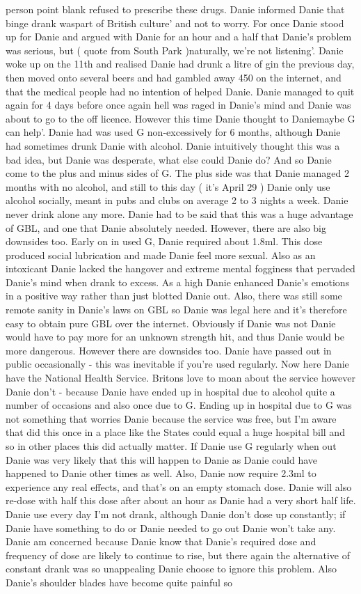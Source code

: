 \documentclass[12pt]{book}
\begin{document}
person point blank refused to prescribe these drugs. Danie informed Danie that binge drank waspart of British culture' and not to worry. For once Danie stood up for Danie and argued with Danie for an hour and a half that Danie's problem was serious, but ( quote from South Park )naturally, we're not listening'. Danie woke up on the 11th and realised Danie had drunk a litre of gin the previous day, then moved onto several beers and had gambled away 450 on the internet, and that the medical people had no intention of helped Danie. Danie managed to quit again for 4 days before once again hell was raged in Danie's mind and Danie was about to go to the off licence. However this time Danie thought to Daniemaybe G can help'. Danie had was used G non-excessively for 6 months, although Danie had sometimes drunk Danie with alcohol. Danie intuitively thought this was a bad idea, but Danie was desperate, what else could Danie do? And so Danie come to the plus and minus sides of G. The plus side was that Danie managed 2 months with no alcohol, and still to this day ( it's April 29 ) Danie only use alcohol socially, meant in pubs and clubs on average 2 to 3 nights a week. Danie never drink alone any more. Danie had to be said that this was a huge advantage of GBL, and one that Danie absolutely needed. However, there are also big downsides too. Early on in used G, Danie required about 1.8ml. This dose produced social lubrication and made Danie feel more sexual. Also as an intoxicant Danie lacked the hangover and extreme mental fogginess that pervaded Danie's mind when drank to excess. As a high Danie enhanced Danie's emotions in a positive way rather than just blotted Danie out. Also, there was still some remote sanity in Danie's laws on GBL so Danie was legal here and it's therefore easy to obtain pure GBL over the internet. Obviously if Danie was not Danie would have to pay more for an unknown strength hit, and thus Danie would be more dangerous. However there are downsides too. Danie have passed out in public occasionally - this was inevitable if you're used regularly. Now here Danie have the National Health Service. Britons love to moan about the service however Danie don't - because Danie have ended up in hospital due to alcohol quite a number of occasions and also once due to G. Ending up in hospital due to G was not something that worries Danie because the service was free, but I'm aware that did this once in a place like the States could equal a huge hospital bill and so in other places this did actually matter. If Danie use G regularly when out Danie was very likely that this will happen to Danie as Danie could have happened to Danie other times as well. Also, Danie now require 2.3ml to experience any real effects, and that's on an empty stomach dose. Danie will also re-dose with half this dose after about an hour as Danie had a very short half life. Danie use every day I'm not drank, although Danie don't dose up constantly; if Danie have something to do or Danie needed to go out Danie won't take any. Danie am concerned because Danie know that Danie's required dose and frequency of dose are likely to continue to rise, but there again the alternative of constant drank was so unappealing Danie choose to ignore this problem. Also Danie's shoulder blades have become quite painful so 
\end{document}
